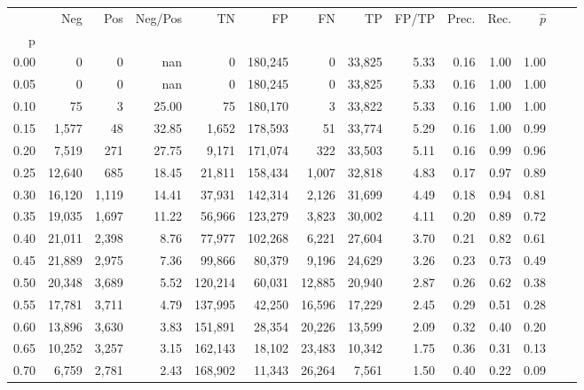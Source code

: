 \begin{tabular}{rrrrrrrrrrrrrr}
\toprule
{} &     Neg &    Pos & Neg/Pos &       TN &       FP &      FN &      TP & FP/TP & Prec. &  Rec. & $\hat{p}$ \\
p    &         &        &         &          &          &         &         &       &       &       &           \\
\midrule
0.00 &       0 &      0 &     nan &        0 &  180,245 &       0 &  33,825 &  5.33 &  0.16 &  1.00 &      1.00 \\
0.05 &       0 &      0 &     nan &        0 &  180,245 &       0 &  33,825 &  5.33 &  0.16 &  1.00 &      1.00 \\
0.10 &      75 &      3 &   25.00 &       75 &  180,170 &       3 &  33,822 &  5.33 &  0.16 &  1.00 &      1.00 \\
0.15 &   1,577 &     48 &   32.85 &    1,652 &  178,593 &      51 &  33,774 &  5.29 &  0.16 &  1.00 &      0.99 \\
0.20 &   7,519 &    271 &   27.75 &    9,171 &  171,074 &     322 &  33,503 &  5.11 &  0.16 &  0.99 &      0.96 \\
0.25 &  12,640 &    685 &   18.45 &   21,811 &  158,434 &   1,007 &  32,818 &  4.83 &  0.17 &  0.97 &      0.89 \\
0.30 &  16,120 &  1,119 &   14.41 &   37,931 &  142,314 &   2,126 &  31,699 &  4.49 &  0.18 &  0.94 &      0.81 \\
0.35 &  19,035 &  1,697 &   11.22 &   56,966 &  123,279 &   3,823 &  30,002 &  4.11 &  0.20 &  0.89 &      0.72 \\
0.40 &  21,011 &  2,398 &    8.76 &   77,977 &  102,268 &   6,221 &  27,604 &  3.70 &  0.21 &  0.82 &      0.61 \\
0.45 &  21,889 &  2,975 &    7.36 &   99,866 &   80,379 &   9,196 &  24,629 &  3.26 &  0.23 &  0.73 &      0.49 \\
0.50 &  20,348 &  3,689 &    5.52 &  120,214 &   60,031 &  12,885 &  20,940 &  2.87 &  0.26 &  0.62 &      0.38 \\
0.55 &  17,781 &  3,711 &    4.79 &  137,995 &   42,250 &  16,596 &  17,229 &  2.45 &  0.29 &  0.51 &      0.28 \\
0.60 &  13,896 &  3,630 &    3.83 &  151,891 &   28,354 &  20,226 &  13,599 &  2.09 &  0.32 &  0.40 &      0.20 \\
0.65 &  10,252 &  3,257 &    3.15 &  162,143 &   18,102 &  23,483 &  10,342 &  1.75 &  0.36 &  0.31 &      0.13 \\
0.70 &   6,759 &  2,781 &    2.43 &  168,902 &   11,343 &  26,264 &   7,561 &  1.50 &  0.40 &  0.22 &      0.09 \\

\end{tabular}
